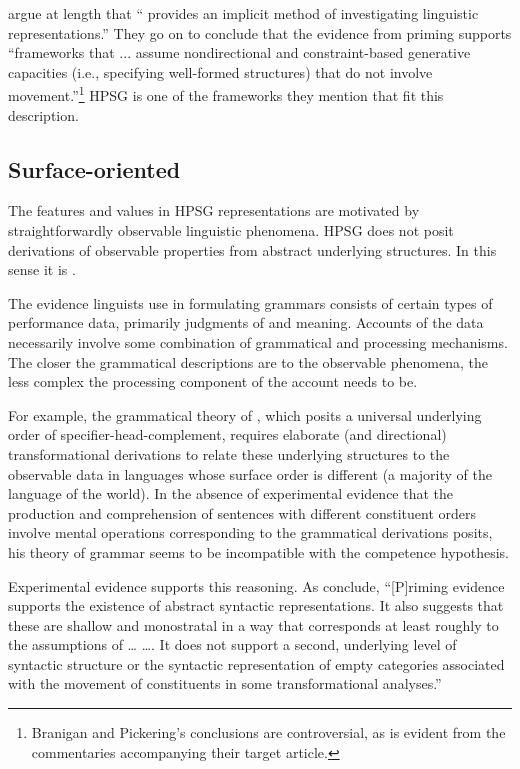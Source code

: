 \documentclass[a4paper]{article}
\begin{document}
\citet{BraniganPickering2017} argue at length that `` provides an implicit method of investigating linguistic representations.''  They go on to conclude that the evidence from priming supports ``frameworks that ... assume nondirectional and constraint-based generative capacities (i.e., specifying well-formed structures) that do not involve movement.''\footnote{Branigan and Pickering's conclusions are controversial, as is evident from the commentaries accompanying their target article.}  HPSG is one of the frameworks they mention that fit this description.   

\subsection{Surface-oriented}

The features and values in HPSG representations are motivated by straightforwardly observable linguistic phenomena. HPSG does not posit derivations of observable properties from abstract
underlying structures.  In this sense it is .

The evidence linguists use in formulating grammars consists of certain types of performance data, primarily judgments of  and meaning.  Accounts of the data necessarily involve some
combination of grammatical and processing mechanisms.  The closer the grammatical descriptions are to the observable phenomena, the less complex the processing component of the account needs to be.

For example, the grammatical theory of \citet{Kayne94a-u}, which posits a universal underlying order of specifier-head-complement, requires elaborate (and directional) transformational derivations to
relate these underlying structures to the observable data in languages whose surface order is different (a majority of the language of the world).  In the absence of experimental evidence that
the production and comprehension of sentences with different constituent orders involve mental operations corresponding to the grammatical derivations \citeauthor{Kayne94a-u} posits, his theory of grammar seems to be incompatible with the competence hypothesis.

Experimental evidence supports this reasoning.  As \citet{BraniganPickering2017} conclude, ``[P]riming evidence supports the existence of abstract syntactic representations. It also suggests
that these are shallow and monostratal in a way that corresponds at least roughly to the assumptions of \ldots{} \citet{ps2} \ldots{}. It does not support a second, underlying level of syntactic
structure or the syntactic representation of empty categories associated with the movement of constituents in some transformational analyses.''
\end{document}
